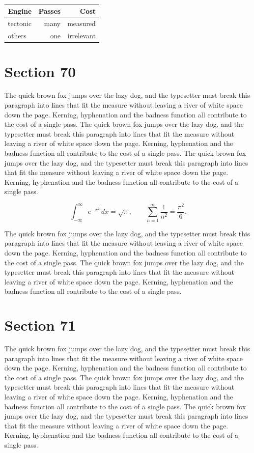 \documentclass{article}
\begin{document}
\begin{center}
\begin{tabular}{lrr}
\toprule
Engine & Passes & Cost \\
\midrule
tectonic & many & measured \\
others & one & irrelevant \\
\bottomrule
\end{tabular}
\end{center}

\section{Section 70}
The quick brown fox jumps over the lazy dog, and the typesetter must break this paragraph into lines that fit the measure without leaving a river of white space down the page. Kerning, hyphenation and the badness function all contribute to the cost of a single pass. The quick brown fox jumps over the lazy dog, and the typesetter must break this paragraph into lines that fit the measure without leaving a river of white space down the page. Kerning, hyphenation and the badness function all contribute to the cost of a single pass. The quick brown fox jumps over the lazy dog, and the typesetter must break this paragraph into lines that fit the measure without leaving a river of white space down the page. Kerning, hyphenation and the badness function all contribute to the cost of a single pass. 

\begin{equation}
\int_{-\infty}^{\infty} e^{-x^{2}}\,dx = \sqrt{\pi}, \qquad
\sum_{n=1}^{\infty} \frac{1}{n^{2}} = \frac{\pi^{2}}{6}.
\end{equation}

The quick brown fox jumps over the lazy dog, and the typesetter must break this paragraph into lines that fit the measure without leaving a river of white space down the page. Kerning, hyphenation and the badness function all contribute to the cost of a single pass. The quick brown fox jumps over the lazy dog, and the typesetter must break this paragraph into lines that fit the measure without leaving a river of white space down the page. Kerning, hyphenation and the badness function all contribute to the cost of a single pass. 
\section{Section 71}
The quick brown fox jumps over the lazy dog, and the typesetter must break this paragraph into lines that fit the measure without leaving a river of white space down the page. Kerning, hyphenation and the badness function all contribute to the cost of a single pass. The quick brown fox jumps over the lazy dog, and the typesetter must break this paragraph into lines that fit the measure without leaving a river of white space down the page. Kerning, hyphenation and the badness function all contribute to the cost of a single pass. The quick brown fox jumps over the lazy dog, and the typesetter must break this paragraph into lines that fit the measure without leaving a river of white space down the page. Kerning, hyphenation and the badness function all contribute to the cost of a single pass. 
\end{document}
